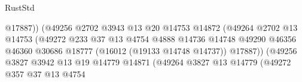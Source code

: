 \begin{lexlean}{RustStd}
\begin{coremodule}
                                                      @17887))
                                                  (@49256
                                                    @2702
                                                    @3943
                                                    @13
                                                    @20
                                                    @14753
                                                    @14872
                                                    (@49264
                                                      @2702
                                                      @13
                                                      @14753
                                                      (@49272
                                                        @233
                                                        @37
                                                        @13
                                                        @4754
                                                        @4888
                                                        @14736
                                                        @14748
                                                        @49290
                                                        @46356
                                                        @46360
                                                        @30686
                                                        @18777
                                                        (@16012 (@19133 @14748 @14737))
                                                        @17887))
                                                    (@49256
                                                      @3827
                                                      @3942
                                                      @13
                                                      @19
                                                      @14779
                                                      @14871
                                                      (@49264
                                                        @3827
                                                        @13
                                                        @14779
                                                        (@49272
                                                          @357
                                                          @37
                                                          @13
                                                          @4754

\end{coremodule}
\end{lexlean}
